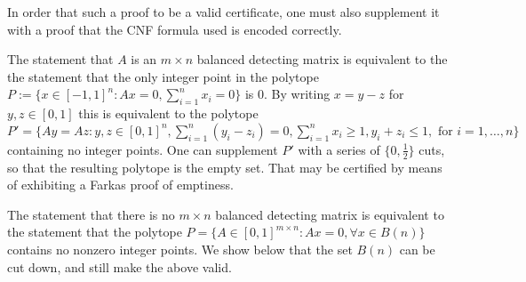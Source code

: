 \documentclass{article}
\begin{document}
In order that such a proof to be a valid certificate, one must also
supplement it with a proof that the CNF formula used is encoded
correctly.

The statement that $A$ is an $m \times n$ balanced detecting matrix is
equivalent to the the statement that the only integer point in the
polytope $P := \{x \in [-1,1]^n : A x = 0, \sum_{i=1}^n x_i = 0 \}$ is
$0$.  By writing $x = y-z$ for $y,z \in [0,1]$ this is equivalent to
the polytope
$P' = \{A y = Az : y, z \in [0,1]^n, \sum_{i=1}^n (y_i - z_i) = 0,
\sum_{i=1}^n x_i \ge 1, y_i + z_i \le 1, \text{ for } i=1, \dots, n\}$
containing no integer points.  One can supplement $P'$ with a series
of $\{0, \frac 1 2 \}$ cuts, so that the resulting polytope is the
empty set.  That may be certified by means of exhibiting a Farkas
proof of emptiness.

The statement that there is no $m \times n$ balanced detecting matrix
is equivalent to the statement that the polytope
$P = \{A \in [0,1]^{m \times n} : A x = 0, \forall x \in B(n)\}$
contains no nonzero integer points.  We show below that the set $B(n)$
can be cut down, and still make the above valid.




\end{document}
